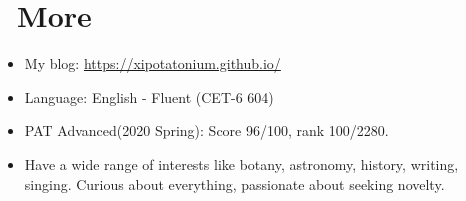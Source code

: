 \documentclass{resume}
\begin{document}
\section{\faInfo\ More}
\begin{itemize}[parsep=0.25ex]
  \item My blog: \url{https://xipotatonium.github.io/}
  \item Language: English - Fluent (CET-6 604)
  \item PAT Advanced(2020 Spring): Score 96/100, rank 100/2280.
  \item Have a wide range of interests like botany, astronomy, history, writing, singing. 
        Curious about everything, passionate about seeking novelty.
\end{itemize}
\end{document}

